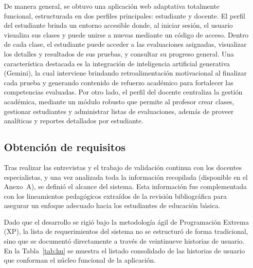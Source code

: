 De manera general, se obtuvo una aplicación web adaptativa totalmente funcional, estructurada en dos perfiles principales: estudiante y docente. El perfil del estudiante brinda un entorno accesible donde, al iniciar sesión, el usuario visualiza sus clases y puede unirse a nuevas mediante un código de acceso. Dentro de cada clase, el estudiante puede acceder a las evaluaciones asignadas, visualizar los detalles y resultados de sus pruebas, y consultar su progreso general. Una característica destacada es la integración de inteligencia artificial generativa (Gemini), la cual interviene brindando retroalimentación motivacional al finalizar cada prueba y generando contenido de refuerzo académico para fortalecer las competencias evaluadas. Por otro lado, el perfil del docente centraliza la gestión académica, mediante un módulo robusto que permite al profesor crear clases, gestionar estudiantes y administrar listas de evaluaciones, además de proveer analíticas y reportes detallados por estudiante.

\subsection{Obtención de requisitos}

Tras realizar las entrevistas y el trabajo de validación continua con los docentes especialistas, y una vez analizada toda la información recopilada (disponible en el Anexo~A), se definió el alcance del sistema. Esta información fue complementada con los lineamientos pedagógicos extraídos de la revisión bibliográfica para asegurar un enfoque adecuado hacia los estudiantes de educación básica.

Dado que el desarrollo se rigió bajo la metodología ágil de Programación Extrema (XP), la lista de requerimientos del sistema no se estructuró de forma tradicional, sino que se documentó directamente a través de veintinueve historias de usuario. En la Tabla~\ref{tab:hu} se muestra el listado consolidado de las historias de usuario que conforman el núcleo funcional de la aplicación.

